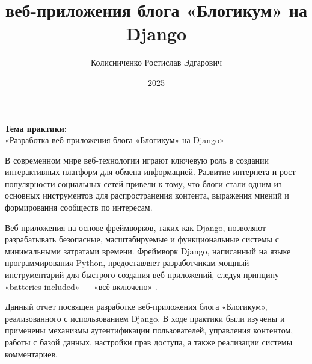 \documentclass[pract,och,bachelor]{SCWorks}
\begin{document}
\title{веб-приложения блога «Блогикум» на Django}
\author{Колисниченко Ростислав Эдгарович}




\date{2025}

\maketitle

\newpage
\thispagestyle{plain}
\begin{center}
\vspace*{\fill}
\textbf{\Large Тема практики:} \\[1cm]
\Large «Разработка веб-приложения блога «Блогикум» на Django»
\vspace*{\fill}
\end{center}
\newpage

\tableofcontents
\newpage

\intro

В современном мире веб-технологии играют ключевую роль в создании интерактивных платформ для обмена информацией. Развитие интернета и рост популярности социальных сетей привели к тому, что блоги стали одним из основных инструментов для распространения контента, выражения мнений и формирования сообществ по интересам.

Веб-приложения на основе фреймворков, таких как Django, позволяют разрабатывать безопасные, масштабируемые и функциональные системы с минимальными затратами времени. Фреймворк Django, написанный на языке программирования Python, предоставляет разработчикам мощный инструментарий для быстрого создания веб-приложений, следуя принципу «batteries included» --- «всё включено» \cite{django}.

Данный отчет посвящен разработке веб-приложения блога «Блогикум», реализованного с использованием Django. В ходе практики были изучены и применены механизмы аутентификации пользователей, управления контентом, работы с базой данных, настройки прав доступа, а также реализации системы комментариев.
\end{document}
